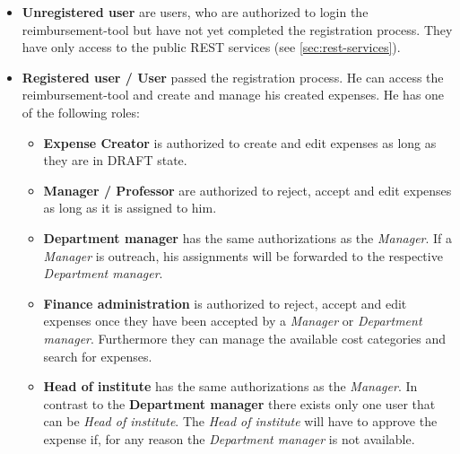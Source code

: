 \begin{itemize}
	\item \textbf{Unregistered user} are users, who are authorized to login the reimbursement-tool but have not yet completed the registration process. They have only access to the public REST services (see \ref{sec:rest-services}).
	\item \textbf{Registered user / User} passed the registration process. He can access the reimbursement-tool and create and manage his created expenses. He has one of the following roles:
	
	\begin{itemize}
		\item \textbf{Expense Creator} is authorized to create and edit expenses as long as they are in DRAFT state.
		
		\item \textbf{Manager / Professor} are authorized to reject, accept and edit expenses as long as it is assigned to him.
		
		\item \textbf{Department manager} has the same authorizations as the \textit{Manager}. If a \textit{Manager} is outreach, his assignments will be forwarded to the respective \textit{Department manager}.
		
		\item \textbf{Finance administration} is authorized to reject, accept and edit expenses once they have been accepted by a \textit{Manager} or \textit{Department manager}. Furthermore they can manage the available cost categories and search for expenses.
		
		\item \textbf{Head of institute} has the same authorizations as the \textit{Manager}. In contrast to the \textbf{Department manager} there exists only one user that can be \textit{Head of institute}. The \textit{Head of institute} will have to approve the expense if, for any reason the \textit{Department manager} is not available.
	\end{itemize}
\end{itemize}
